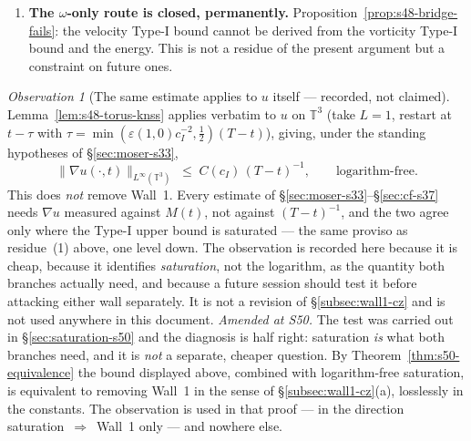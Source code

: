 \documentclass[11pt]{article}
\theoremstyle{definition}
\theoremstyle{remark}
\newtheorem{observation}[theorem]{Observation}
\newcommand{\T}{\mathbb{T}}
\begin{document}
\begin{enumerate}[label=(\arabic*),leftmargin=2.4em]
  Remark~\ref{rem:s39-distance} stands verbatim, including its ceiling
  (``no Type-I singularity \dots\ strictly less than the Clay problem'') and
  its Type-II reservation. Wall~3 is unaffected. In the ledger of
  \S\ref{sec:rigidity-s39} the rows reading ``mod (R)'' become
  \emph{Proved}; the rows reading ``mod (R),(N)'', ``mod (R),(N$'$)'' and
  ``mod (R),(A-up)'' lose only the (R).
\item \textbf{The $\omega$-only route is closed, permanently.}
  Proposition~\ref{prop:s48-bridge-fails}: the velocity Type-I bound cannot be
  derived from the vorticity Type-I bound and the energy. This is not a
  residue of the present argument but a constraint on future ones.
\end{enumerate}

\begin{observation}[The same estimate applies to $u$ itself --- recorded, not
  claimed]\label{obs:s48-wall1}
  Lemma~\ref{lem:s48-torus-knss} applies verbatim to $u$ on $\T^3$ (take
  $L=1$, restart at $t-\tau$ with $\tau=\min(\varepsilon(1,0)c_I^{-2},
  \tfrac12)(T-t)$), giving, under the standing hypotheses of
  \S\ref{sec:moser-s33},
  \[
    \|\nabla u(\cdot,t)\|_{L^\infty(\T^3)} \;\leq\; C(c_I)\,(T-t)^{-1},
    \qquad \text{logarithm-free.}
  \]
  This does \emph{not} remove Wall~1. Every estimate of
  \S\ref{sec:moser-s33}--\S\ref{sec:cf-s37} needs $\nabla u$ measured against
  $M(t)$, not against $(T-t)^{-1}$, and the two agree only where the Type-I
  upper bound is saturated --- the same proviso as residue~(1) above, one
  level down. The observation is recorded here because it is cheap, because it
  identifies \emph{saturation}, not the logarithm, as the quantity both
  branches actually need, and because a future session should test it before
  attacking either wall separately. It is not a revision of
  \S\ref{subsec:wall1-cz} and is not used anywhere in this document.
  \emph{Amended at S50.} The test was carried out in
  \S\ref{sec:saturation-s50} and the diagnosis is half right: saturation
  \emph{is} what both branches need, and it is \emph{not} a separate,
  cheaper question. By Theorem~\ref{thm:s50-equivalence} the bound displayed
  above, combined with logarithm-free saturation, is equivalent to removing
  Wall~1 in the sense of \S\ref{subsec:wall1-cz}(a), losslessly in the
  constants. The observation is used in that proof --- in the direction
  saturation~$\Rightarrow$~Wall~1 only --- and nowhere else.
\end{observation}
\end{document}
